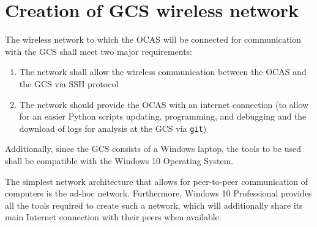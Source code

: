 
\chapter{Creation of GCS wireless network} \label{app:network}

The wireless network to which the OCAS will be connected for communication with the GCS shall meet two major requirements:
\begin{enumerate}
	\item The network shall allow the wireless communication between the OCAS and the GCS via SSH protocol
	\item The network should provide the OCAS with an internet connection (to allow for an easier Python scripts updating, programming, and debugging and the download of logs for analysis at the GCS via \texttt{git})
\end{enumerate}

Additionally, since the GCS consists of a Windows laptop, the tools to be used shall be compatible with the Windows 10 Operating System.

The simplest network architecture that allows for peer-to-peer communication of computers is the ad-hoc network.
Furthermore, Windows 10 Professional provides all the tools required to create such a network, which will additionally share its main Internet connection with their peers when available.

